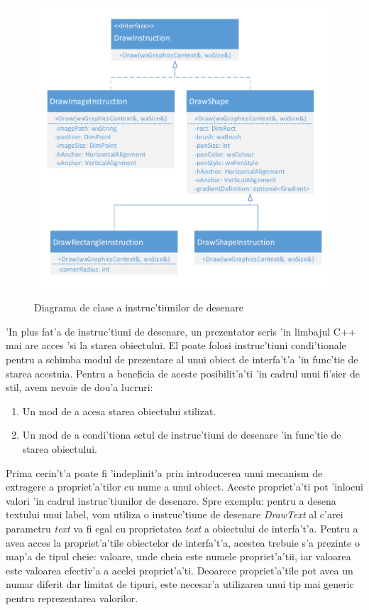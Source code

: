 \begin{figure}[h]
    \centering
    \includegraphics{img/uml_class_draw_instructions.pdf}
    \label{fig0403}
    \caption{Diagrama de clase a instruc'tiunilor de desenare}
\end{figure}

'In plus fat'a de instruc'tiuni de desenare, un prezentator scris 'in limbajul C++ mai are acces 'si la starea obiectului. El poate folosi instruc'tiuni condi'tionale pentru a schimba modul de prezentare al unui obiect de interfa't'a 'in func'tie de starea acestuia. Pentru a beneficia de aceste posibilit'a'ti 'in cadrul unui fi'sier de stil, avem nevoie de dou'a lucruri:

\begin{enumerate}
\item Un mod de a acesa starea obiectului stilizat.
\item Un mod de a condi'tiona setul de instruc'tiuni de desenare 'in func'tie de starea obiectului.
\end{enumerate}

Prima cerin't'a poate fi 'indeplinit'a prin introducerea unui mecanism de extragere a propriet'a'tilor cu nume a unui obiect. Aceste propriet'a'ti pot 'inlocui valori 'in cadrul instruc'tiunilor de desenare. Spre exemplu: pentru a desena textului unui label, vom utiliza o instruc'tiune de desenare \emph{DrawText} al c'arei parametru \emph{text} va fi egal cu proprietatea \emph{text} a obiectului de interfa't'a. Pentru a avea acces la propriet'a'tile obiectelor de interfa't'a, acestea trebuie s'a prezinte o map'a de tipul cheie: valoare, unde cheia este numele propriet'a'tii, iar valoarea este valoarea efectiv'a a acelei propriet'a'ti. Deoarece propriet'a'tile pot avea un numar diferit dar limitat de tipuri, este necesar'a utilizarea unui tip mai generic pentru reprezentarea valorilor.

